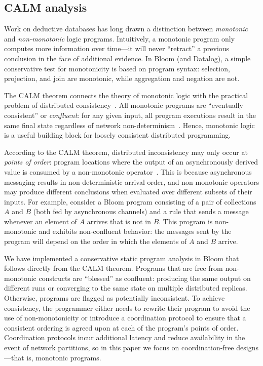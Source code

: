 \subsection{CALM analysis}
\label{sec:bg-calm}

Work on deductive databases has long drawn a distinction between
\emph{monotonic} and \emph{non-monotonic} logic programs. Intuitively, a
monotonic program only computes more information over time---it will never
``retract'' a previous conclusion in the face of additional evidence.  In Bloom
(and Datalog), a simple conservative test for monotonicity is based on program
syntax: selection, projection, and join are monotonic, while aggregation and
negation are not.

The CALM theorem connects the theory of monotonic logic with the practical
problem of distributed consistency~\cite{Alvaro2011,Hellerstein2010}.  All
monotonic programs are ``eventually consistent'' or \emph{confluent}: for any
given input, all program executions result in the same final state regardless of
network non-determinism~\cite{Ameloot2011,dedalus-confluence}.  Hence, monotonic
logic is a useful building block for loosely consistent distributed programming.

According to the CALM theorem, distributed inconsistency may only occur at
\emph{points of order}: program locations where the output of an asynchronously
derived value is consumed by a non-monotonic operator~\cite{Alvaro2011}.  This
is because asynchronous messaging results in non-deterministic arrival order,
and non-monotonic operators may produce different conclusions when evaluated
over different subsets of their inputs.  For example, consider a Bloom program
consisting of a pair of collections $A$ and $B$ (both fed by asynchronous
channels) and a rule that sends a message whenever an element of $A$ arrives
that is not in $B$.  This program is non-monotonic and exhibits non-confluent
behavior: the messages sent by the program will depend on the order in which the
elements of $A$ and $B$ arrive.

We have implemented a conservative static program analysis in Bloom that follows
directly from the CALM theorem.  Programs that are free from non-monotonic
constructs are ``blessed'' as confluent: producing the same output on different
runs or converging to the same state on multiple distributed replicas.
Otherwise, programs are flagged as potentially inconsistent.  To achieve
consistency, the programmer either needs to rewrite their program to avoid the
use of non-monotonicity or introduce a coordination protocol to ensure that a
consistent ordering is agreed upon at each of the program's points of order.
Coordination protocols incur additional latency and reduce availability in the
event of network partitions, so in this paper we focus on coordination-free
designs---that is, monotonic programs.

